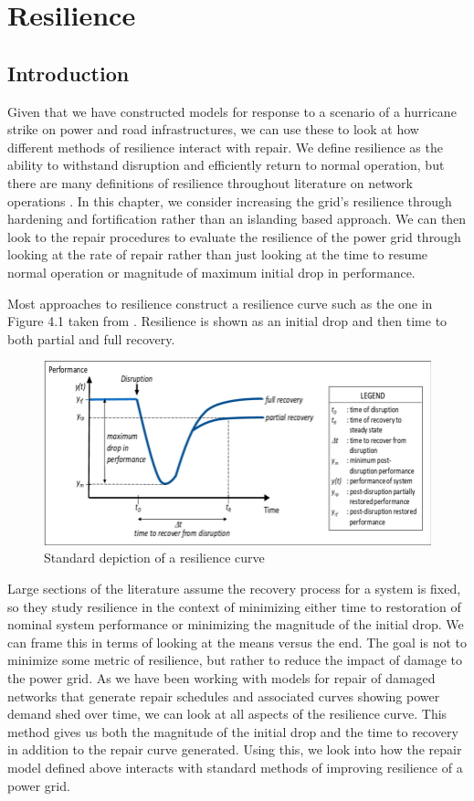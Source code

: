 \chapter{Resilience}
%
\section{Introduction}
Given that we have constructed models for response to a scenario of a hurricane strike on power and road infrastructures, we can use these to look at how different methods of resilience interact with repair. We define resilience as the ability to withstand disruption and efficiently return to normal operation, but there are many definitions of resilience throughout literature on network operations \cite{MolyneauxEA2016}. In this chapter, we consider increasing the grid's resilience through hardening and fortification rather than an islanding based approach. We can then look to the repair procedures to evaluate the resilience of the power grid through looking at the rate of repair rather than just looking at the time to resume normal operation or magnitude of maximum initial drop in performance.

Most approaches to resilience construct a resilience curve such as the one in Figure 4.1  taken from \cite{Madni2020}. Resilience is shown as an initial drop and then time to both partial and full recovery.

\begin{figure}[htbp]
	\centering
	\includegraphics[width=.9\linewidth]{resiliencecurve.png}
	\caption{Standard depiction of a resilience curve}
\end{figure}

Large sections of the literature assume the recovery process for a system is fixed, so they study resilience in the context of minimizing either time to restoration of nominal system performance or minimizing the magnitude of the initial drop. We can frame this in terms of looking at the means versus the end. The goal is not to minimize some metric of resilience, but rather to reduce the impact of damage to the power grid. As we have been working with models for repair of damaged networks that generate repair schedules and associated curves showing power demand shed over time, we can look at all aspects of the resilience curve. This method gives us both the magnitude of the initial drop and the time to recovery in addition to the repair curve generated. Using this, we look into how the repair model defined above interacts with standard methods of improving resilience of a power grid.

